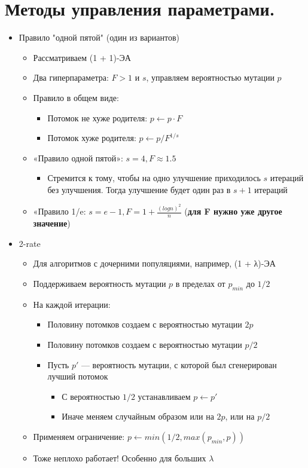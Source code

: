 \section{Методы управления параметрами.}

\begin{itemize}
    \item Правило "одной пятой" (один из вариантов)
    \begin{itemize}
        \item Рассматриваем (1 + 1)-ЭА
        \item Два гиперпараметра: $F > 1$ и $s$, управляем вероятностью мутации $p$
        \item Правило в общем виде:
        \begin{itemize}
            \item Потомок не хуже родителя: $p ← p · F$ 
            \item Потомок хуже родителя: $p ← p/F^{1/s}$
        \end{itemize}
        \item «Правило одной пятой»: $s= 4, F \approx 1.5$
        \begin{itemize}
            \item Стремится к тому, чтобы на одно улучшение приходилось $s$ итераций без улучшения. Тогда улучшение будет один раз в $s + 1$ итераций
        \end{itemize}
        \item «Правило 1/e: $s= e-1, F = 1 + \frac{(logn)^2}{n}$ (\textbf{для F нужно уже другое значение})
    \end{itemize}
    \item 2-rate
    \begin{itemize}
        \item Для алгоритмов с дочерними популяциями, например, (1 + λ)-ЭА 
        \item Поддерживаем вероятность мутации $p$ в пределах от $p_{min}$ до $1/2$
        \item На каждой итерации:
        \begin{itemize}
            \item Половину потомков создаем с вероятностью мутации $2p$
            \item Половину потомков создаем с вероятностью мутации $p/2$
            \item Пусть $p′$ — вероятность мутации, с которой был сгенерирован лучший потомок
            \begin{itemize}
                \item С вероятностью $1/2$ устанавливаем $p ← p′$
                \item Иначе меняем случайным образом или на $2p$, или на $p/2$
            \end{itemize}
        \end{itemize}
        \item Применяем ограничение: $p ← min(1/2, max(p_{min}, p ))$
        \item Тоже неплохо работает! Особенно для больших $λ$    
    \end{itemize}
\end{itemize}


